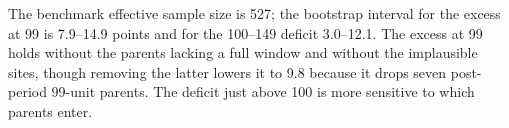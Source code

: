 The benchmark effective sample size is 527; the bootstrap interval for the
excess at 99 is 7.9--14.9 points and for the 100--149 deficit 3.0--12.1. The
excess at 99 holds without the parents lacking a full window and without the
implausible sites, though removing the latter lowers it to 9.8 because it
drops seven post-period 99-unit parents. The deficit just above 100 is more
sensitive to which parents enter.

